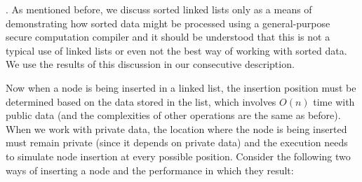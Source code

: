 \documentclass[11pt]{article}
\begin{document}
\medskip {}. As mentioned before, we
discuss sorted linked lists only as a means of demonstrating how sorted data
might be processed using a general-purpose secure computation compiler and
it should be understood that this is not a typical use of linked lists or
even not the best way of working with sorted data. We use the results of
this discussion in our consecutive description.

Now when a node is being inserted in a linked list, the insertion position
must be determined based on the data stored in the list, which involves
$O(n)$ time with public data (and the complexities of other operations are
the same as before). When we work with private data, the location where the
node is being inserted must remain private (since it depends on private
data) and the execution needs to simulate node insertion at every possible
position. Consider the following two ways of inserting a node and the
performance in which they result:
\end{document}
